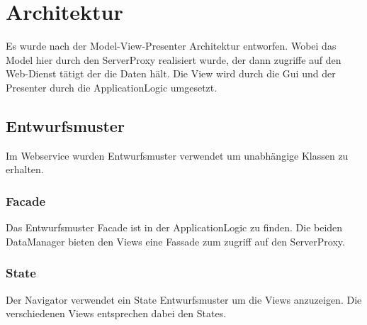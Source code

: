 \section{Architektur}
Es wurde nach der Model-View-Presenter Architektur entworfen. Wobei das Model hier durch den ServerProxy realisiert wurde, der dann zugriffe auf den Web-Dienst tätigt der die Daten hält. Die View wird durch die Gui und der Presenter durch die ApplicationLogic umgesetzt.

\subsection{Entwurfsmuster}
Im Webservice wurden Entwurfsmuster verwendet um unabhängige Klassen zu erhalten.

\subsubsection{Facade}
Das Entwurfsmuster Facade ist in der ApplicationLogic zu finden. Die beiden DataManager bieten den Views eine Fassade zum zugriff auf den ServerProxy.

\subsubsection{State}
Der Navigator verwendet ein State Entwurfsmuster um die Views anzuzeigen. Die verschiedenen Views entsprechen dabei den States.